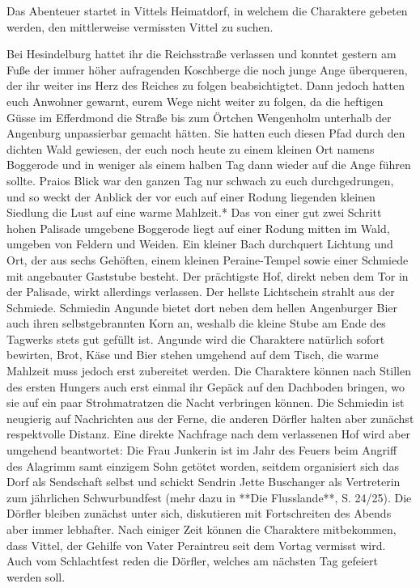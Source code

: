 \platz
Das Abenteuer startet in Vittels Heimatdorf, in welchem die Charaktere gebeten werden, den mittlerweise vermissten Vittel zu suchen. 


Bei Hesindelburg hattet ihr die Reichsstraße verlassen und konntet gestern am Fuße der immer höher aufragenden Koschberge die noch junge Ange überqueren, der ihr weiter ins Herz des Reiches zu folgen beabsichtigtet. Dann jedoch hatten euch Anwohner gewarnt, eurem Wege nicht weiter zu folgen, da die heftigen Güsse im Efferdmond die Straße bis zum Örtchen Wengenholm unterhalb der Angenburg unpassierbar gemacht hätten. Sie hatten euch diesen Pfad durch den dichten Wald gewiesen, der euch noch heute zu einem kleinen Ort namens Boggerode und in weniger als einem halben Tag dann wieder auf die Ange führen sollte. Praios Blick war den ganzen Tag nur schwach zu euch durchgedrungen, und so weckt der Anblick der vor euch auf einer Rodung liegenden kleinen Siedlung die Lust auf eine warme Mahlzeit.*
\platz
Das von einer gut zwei Schritt hohen Palisade umgebene Boggerode liegt auf einer Rodung mitten im Wald, umgeben von Feldern und Weiden. Ein kleiner Bach durchquert Lichtung und Ort, der aus sechs Gehöften, einem kleinen Peraine-Tempel sowie einer Schmiede mit angebauter Gaststube besteht. Der prächtigste Hof, direkt neben dem Tor in der Palisade, wirkt allerdings verlassen. Der hellste Lichtschein strahlt aus der Schmiede. Schmiedin Angunde bietet dort neben dem hellen Angenburger Bier auch ihren selbstgebrannten Korn an, weshalb die kleine Stube am Ende des Tagwerks stets gut gefüllt ist. Angunde wird die Charaktere natürlich sofort bewirten, Brot, Käse und Bier stehen umgehend auf dem Tisch, die warme Mahlzeit muss jedoch erst zubereitet werden. Die Charaktere können nach Stillen des ersten Hungers auch erst einmal ihr Gepäck auf den Dachboden bringen, wo sie auf ein paar Strohmatratzen die Nacht verbringen können. Die Schmiedin ist neugierig auf Nachrichten aus der Ferne, die anderen Dörfler halten aber zunächst respektvolle Distanz. Eine direkte Nachfrage nach dem verlassenen Hof wird aber umgehend beantwortet: Die Frau Junkerin ist im Jahr des Feuers beim Angriff des Alagrimm samt einzigem Sohn getötet worden, seitdem organisiert sich das Dorf als Sendschaft selbst und schickt Sendrin Jette Buschanger als Vertreterin zum jährlichen Schwurbundfest (mehr dazu in **Die Flusslande**, S. 24/25).
\platz
Die Dörfler bleiben zunächst unter sich, diskutieren mit Fortschreiten des Abends aber immer lebhafter. Nach einiger Zeit können die Charaktere mitbekommen, dass Vittel, der Gehilfe von Vater Peraintreu seit dem Vortag vermisst wird. Auch vom Schlachtfest reden die Dörfler, welches am nächsten Tag gefeiert werden soll.


